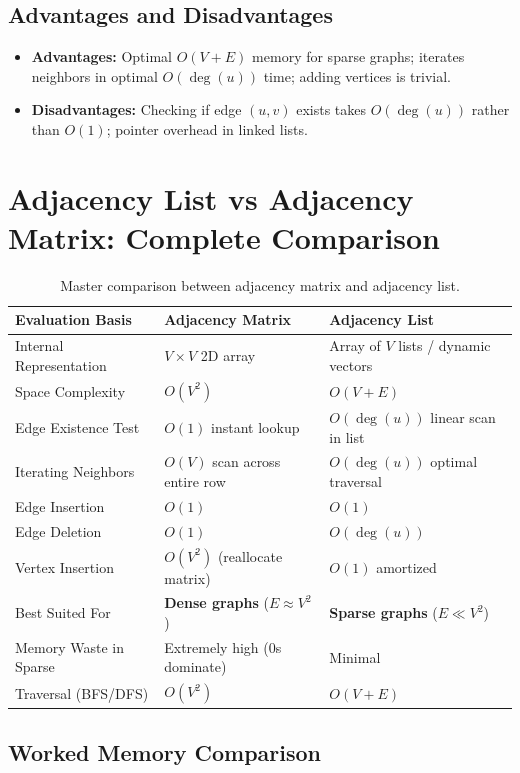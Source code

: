 \subsection{Advantages and Disadvantages}
\begin{itemize}
    \item \textbf{Advantages:} Optimal $O(V + E)$ memory for sparse graphs; iterates neighbors in optimal $O(\deg(u))$ time; adding vertices is trivial.
    \item \textbf{Disadvantages:} Checking if edge $(u, v)$ exists takes $O(\deg(u))$ rather than $O(1)$; pointer overhead in linked lists.
\end{itemize}

\section{Adjacency List vs Adjacency Matrix: Complete Comparison}

\begin{table}[htbp]
\centering
\small
\begin{tabularx}{\textwidth}{p{3.2cm} X X}
\toprule
\textbf{Evaluation Basis} & \textbf{Adjacency Matrix} & \textbf{Adjacency List} \\
\midrule
Internal Representation & $V \times V$ 2D array & Array of $V$ lists / dynamic vectors \\
Space Complexity & $O(V^2)$ & $O(V + E)$ \\
Edge Existence Test & $O(1)$ instant lookup & $O(\deg(u))$ linear scan in list \\
Iterating Neighbors & $O(V)$ scan across entire row & $O(\deg(u))$ optimal traversal \\
Edge Insertion & $O(1)$ & $O(1)$ \\
Edge Deletion & $O(1)$ & $O(\deg(u))$ \\
Vertex Insertion & $O(V^2)$ (reallocate matrix) & $O(1)$ amortized \\
Best Suited For & \textbf{Dense graphs} ($E \approx V^2$) & \textbf{Sparse graphs} ($E \ll V^2$) \\
Memory Waste in Sparse & Extremely high ($0$s dominate) & Minimal \\
Traversal (BFS/DFS) & $O(V^2)$ & $O(V + E)$ \\
\bottomrule
\end{tabularx}
\caption{Master comparison between adjacency matrix and adjacency list.}
\end{table}

\subsection{Worked Memory Comparison}

